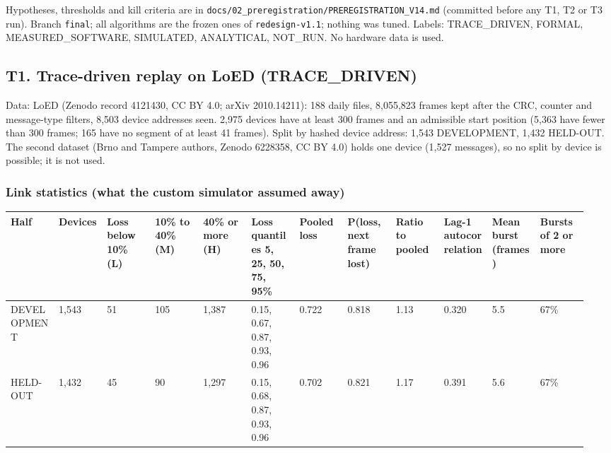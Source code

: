 


Hypotheses, thresholds and kill criteria are in \texttt{docs/02\_preregistration/PREREGISTRATION\_V14.md} (committed before any T1, T2 or T3 run). Branch \texttt{final}; all algorithms are the frozen ones of \texttt{redesign-v1.1}; nothing was tuned. Labels: TRACE\_DRIVEN, FORMAL, MEASURED\_SOFTWARE, SIMULATED, ANALYTICAL, NOT\_RUN. No hardware data is used.

\subsection*{T1. Trace-driven replay on LoED (TRACE\_DRIVEN)}

Data: LoED (Zenodo record 4121430, CC BY 4.0; arXiv 2010.14211): 188 daily files, 8,055,823 frames kept after the CRC, counter and message-type filters, 8,503 device addresses seen. 2,975 devices have at least 300 frames and an admissible start position (5,363 have fewer than 300 frames; 165 have no segment of at least 41 frames). Split by hashed device address: 1,543 DEVELOPMENT, 1,432 HELD-OUT. The second dataset (Brno and Tampere authors, Zenodo 6228358, CC BY 4.0) holds one device (1,527 messages), so no split by device is possible; it is not used.

\subsubsection*{Link statistics (what the custom simulator assumed away)}

{\scriptsize\raggedright
\begin{longtable}{p{0.079\linewidth}p{0.079\linewidth}p{0.079\linewidth}p{0.079\linewidth}p{0.079\linewidth}p{0.079\linewidth}p{0.079\linewidth}p{0.079\linewidth}p{0.079\linewidth}p{0.079\linewidth}p{0.079\linewidth}p{0.079\linewidth}}
\toprule
Half & Devices & Loss below 10\% (L) & 10\% to 40\% (M) & 40\% or more (H) & Loss quantiles 5, 25, 50, 75, 95\% & Pooled loss & P(loss, next frame lost) & Ratio to pooled & Lag-1 autocorrelation & Mean burst (frames) & Bursts of 2 or more \\
\midrule
\endhead
DEVELOPMENT & 1,543 & 51 & 105 & 1,387 & 0.15, 0.67, 0.87, 0.93, 0.96 & 0.722 & 0.818 & 1.13 & 0.320 & 5.5 & 67\% \\
HELD-OUT & 1,432 & 45 & 90 & 1,297 & 0.15, 0.68, 0.87, 0.93, 0.96 & 0.702 & 0.821 & 1.17 & 0.391 & 5.6 & 67\% \\
\bottomrule
\end{longtable}}

